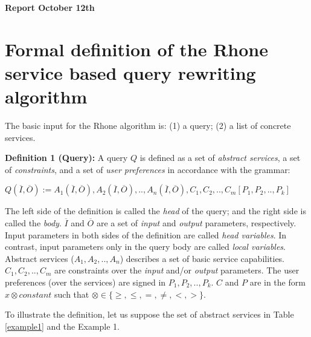 \documentclass[12pt,a4paper,oneside]{article}
\begin{document}
\begin{center}
\textbf{\large{Report October 12th}} \\
\end{center}

\section{Formal definition of the Rhone service based query rewriting algorithm}

The basic input for the Rhone algorithm is: (1) a query; (2) a list of concrete services.

\noindent \textbf{Definition 1 (Query):} 
A query $Q$ is defined as a set of \textit{abstract services}, a set of \textit{constraints}, and a set of \textit{user preferences} in accordance with the grammar: 
\begin{center}
$Q (\overline{I}, \overline{O}) := A_{1}(\overline{I}, \overline{O}), A_{2}(\overline{I}, \overline{O}), ..,  A_{n}(\overline{I}, \overline{O}),C_{1},C_{2}, .., C_{m}[P_{1},P_{2}, .., P_{k}]$
\end{center}  
The left side of the definition is called the \textit{head} of the query; and the right side is called the \textit{body}. 
$\overline{I}$ and $\overline{O}$ are a set of \textit{input} and \textit{output} parameters, respectively.
Input parameters in both sides of the definition are called \textit{head variables}.
In contrast, input parameters only in the query body are called \textit{local variables}.
Abstract services ($A_{1}, A_{2}, .., A_{n}$) describes a set of basic service capabilities.
$C_{1}, C_{2}, .., C_{m}$ are constraints over the \textit{input} and/or \textit{output} parameters.
The user preferences (over the services) are signed in $P_{1}, P_{2}, .., P_{k}$. $C$ and $P$ are in the form $x \otimes constant$ such that $\otimes \in\lbrace \geq, \leq, =, \neq, <, >\rbrace$.

To illustrate the definition, let us suppose the set of abstract services in Table \ref{example1} and the Example 1.
\end{document}
